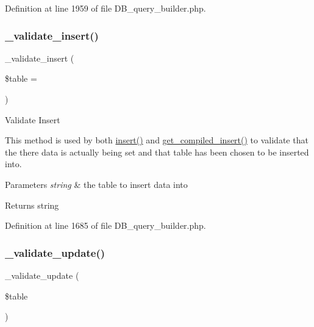 Definition at line 1959 of file D\+B\+\_\+query\+\_\+builder.\+php.

\mbox{\label{class_c_i___d_b__query__builder_acbc0cb4b9bd889fa2ffc5086f65a88a1}} 
\subsubsection{\texorpdfstring{\_validate\_insert()}{\_validate\_insert()}}
{\footnotesize\ttfamily \+\_\+validate\+\_\+insert (\begin{DoxyParamCaption}\item[{}]{\$table = {\ttfamily \textquotesingle{}\textquotesingle{}} }\end{DoxyParamCaption})\hspace{0.3cm}{\ttfamily [protected]}}

Validate Insert

This method is used by both \mbox{\hyperlink{class_c_i___d_b__query__builder_a487027d8e320a1ea657af2d7e61df389}{insert()}} and \mbox{\hyperlink{class_c_i___d_b__query__builder_a09abce3658cfaba8d8a148c91a9be0ea}{get\+\_\+compiled\+\_\+insert()}} to validate that the there data is actually being set and that table has been chosen to be inserted into.


\begin{DoxyParams}{Parameters}
{\em string} & the table to insert data into \\
\hline
\end{DoxyParams}
\begin{DoxyReturn}{Returns}
string 
\end{DoxyReturn}


Definition at line 1685 of file D\+B\+\_\+query\+\_\+builder.\+php.

\mbox{\label{class_c_i___d_b__query__builder_a0da7b6bb840e0331733abafc14399a32}} 
\subsubsection{\texorpdfstring{\_validate\_update()}{\_validate\_update()}}
{\footnotesize\ttfamily \+\_\+validate\+\_\+update (\begin{DoxyParamCaption}\item[{}]{\$table }\end{DoxyParamCaption})\hspace{0.3cm}{\ttfamily [protected]}}

